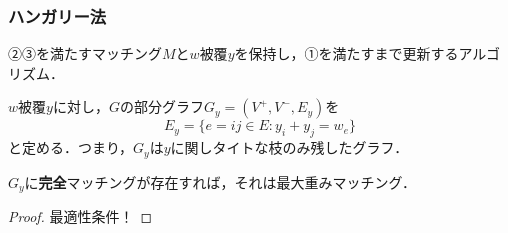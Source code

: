 \documentclass[14pt,aspectratio=169,xcolor=dvipsnames,table,onlytextwidth,dvipdfmx]{beamer}
\begin{document}
\begin{frame}
    \frametitle{ハンガリー法}

    \small
    ②③を満たすマッチング$M$と$w$被覆$y$を保持し，①を満たすまで更新するアルゴリズム．

    \begin{definition}
        $w$被覆$y$に対し，$G$の部分グラフ$G_y = (V^+, V^-, E_y)$を
        \[
            E_y = \{e = ij \in E : y_i + y_j = w_e \} 
        \]
        と定める．つまり，$G_y$は$y$に関しタイトな枝のみ残したグラフ．
    \end{definition}

    \begin{lemma}
        $G_y$に\textbf{完全}マッチングが存在すれば，それは最大重みマッチング．
    \end{lemma}
    \begin{proof} 
        最適性条件！
    \end{proof}
\end{frame}
\end{document}
